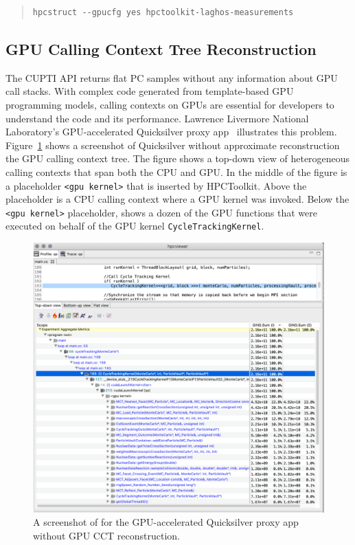\begin{quote}
\begin{verbatim}
hpcstruct --gpucfg yes hpctoolkit-laghos-measurements
\end{verbatim}
\end{quote}


\subsection{GPU Calling Context Tree Reconstruction}
\label{nvidia-cct}



The CUPTI API returns flat PC samples without any information about GPU call stacks.
With complex code generated from template-based GPU programming models, calling contexts on GPUs are essential for developers to understand the code and its performance. Lawrence Livermore National Laboratory's GPU-accelerated Quicksilver proxy app~\cite{quicksilver} illustrates this problem. Figure~\ref{qs-no-cct} shows a \hpcviewer{} screenshot of Quicksilver without approximate reconstruction the GPU calling context tree. The figure shows a top-down view of heterogeneous calling contexts that span both the CPU and GPU. In the middle of the figure is a placeholder \verb|<gpu kernel>| that is inserted by HPCToolkit. Above the placeholder is a CPU calling context where a GPU kernel was invoked. Below the \verb|<gpu kernel>| placeholder, \hpcviewer{} shows a dozen of the GPU functions that were executed on behalf of the GPU kernel \verb|CycleTrackingKernel|.

\begin{figure}[t]
\centering
\includegraphics[width=\textwidth]{fig/qs-no-cct.svg}
\caption{A screenshot of \hpcviewer{} for the GPU-accelerated Quicksilver proxy app without GPU CCT reconstruction.}
\label{qs-no-cct}
\end{figure}


